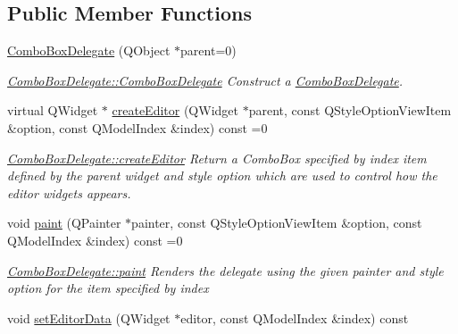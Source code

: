 \subsection*{Public Member Functions}
\begin{DoxyCompactItemize}
\item 
\hyperlink{classGui_1_1Widgets_1_1Delegates_1_1ComboBoxDelegate_a34105ef48d776c556598b9b15e7abdcc}{Combo\+Box\+Delegate} (Q\+Object $\ast$parent=0)
\begin{DoxyCompactList}\small\item\em \hyperlink{classGui_1_1Widgets_1_1Delegates_1_1ComboBoxDelegate_a34105ef48d776c556598b9b15e7abdcc}{Combo\+Box\+Delegate\+::\+Combo\+Box\+Delegate} Construct a \hyperlink{classGui_1_1Widgets_1_1Delegates_1_1ComboBoxDelegate}{Combo\+Box\+Delegate}. \end{DoxyCompactList}\item 
virtual Q\+Widget $\ast$ \hyperlink{classGui_1_1Widgets_1_1Delegates_1_1ComboBoxDelegate_aa24c5896e30295ad7dbe47c91093b2db}{create\+Editor} (Q\+Widget $\ast$parent, const Q\+Style\+Option\+View\+Item \&option, const Q\+Model\+Index \&index) const =0
\begin{DoxyCompactList}\small\item\em \hyperlink{classGui_1_1Widgets_1_1Delegates_1_1ComboBoxDelegate_aa24c5896e30295ad7dbe47c91093b2db}{Combo\+Box\+Delegate\+::create\+Editor} Return a Combo\+Box specified by {\itshape index} item defined by the {\itshape parent} widget and style {\itshape option} which are used to control how the editor widgets appears. \end{DoxyCompactList}\item 
void \hyperlink{classGui_1_1Widgets_1_1Delegates_1_1ComboBoxDelegate_a0b7f0752890cd3fb257361a7990a74c2}{paint} (Q\+Painter $\ast$painter, const Q\+Style\+Option\+View\+Item \&option, const Q\+Model\+Index \&index) const =0
\begin{DoxyCompactList}\small\item\em \hyperlink{classGui_1_1Widgets_1_1Delegates_1_1ComboBoxDelegate_a0b7f0752890cd3fb257361a7990a74c2}{Combo\+Box\+Delegate\+::paint} Renders the delegate using the given {\itshape painter} and style {\itshape option} for the item specified by {\itshape index} \end{DoxyCompactList}\item 
void \hyperlink{classGui_1_1Widgets_1_1Delegates_1_1ComboBoxDelegate_a30d218e265b7656e17fece8a73e53e90}{set\+Editor\+Data} (Q\+Widget $\ast$editor, const Q\+Model\+Index \&index) const 

\end{DoxyCompactItemize}
